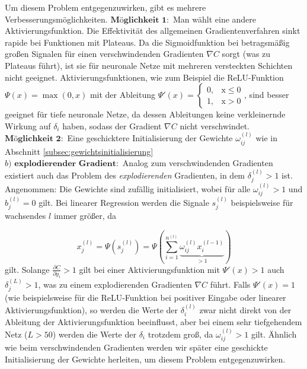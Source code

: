 Um diesem Problem entgegenzuwirken, gibt es mehrere Verbesserungsmöglichkeiten.\linebreak
$\textbf{Möglichkeit 1}:$ Man wählt eine andere Aktivierungsfunktion. Die Effektivität des allgemeinen
Gradientenverfahren sinkt rapide bei Funktionen mit Plateaus. Da die Sigmoidfunktion bei betragsmäßig großen Signalen
für einen verschwindenden Gradienten $\nabla C$ sorgt (was zu Plateaus führt), ist sie für neuronale Netze mit mehreren
versteckten Schichten nicht geeignet. Aktivierungsfunktionen, wie zum Beispiel die ReLU-Funktion $\Psi(x)=\max(0,x)$ mit
der Ableitung $\Psi'(x)= \begin {cases} 0, &\text{x}\leq 0\\ 1, &\text{x}>0\end{cases}$, sind besser geeignet für tiefe neuronale
Netze, da dessen Ableitungen keine verkleinernde Wirkung auf $\delta_i$ haben, sodass der Gradient $\nabla C$ nicht
verschwindet.\\
$\textbf{Möglichkeit 2}:$ Eine geschicktere Initialisierung der Gewichte $\omega_{ij}^{(l)}$ wie in Abschnitt
\ref{subsec:gewichtsinitialisierung}\\
$b)$ $\textbf{explodierender Gradient}:$
Analog zum verschwindenden Gradienten existiert auch das Problem des \textit{explodierenden} Gradienten, in dem
$\delta_j^{(l)}>1$ ist.\\
Angenommen: Die Gewichte sind zufällig initialisiert, wobei für alle $\omega_{ij}^{(l)}>1$ und $b_j^{(l)}=0$
gilt. Bei linearer Regression werden die Signale $s_j^{(l)}$  beispielsweise für wachsendes $l$ immer größer, da

\[
    x_j^{(l)}=\Psi(s_j^{(l)})=\Psi\left( \sum\limits_{i=1}^{n^{(l)}} \underbrace{\omega_{ij}^{(l)}x_{i}^{(l-1)}}_{>1} \right)
\]
gilt. Solange $\frac{\partial C}{\partial y_i} > 1$ gilt bei einer Aktivierungsfunktion mit $\Psi'(x)>1$ auch $\delta_j^{(L)}>1$,
was zu einem explodierenden Gradienten $\nabla C$ führt. Falls $\Psi'(x)=1$ (wie beispielsweise für die ReLU-Funktion bei
positiver Eingabe oder linearer Aktivierungsfunktion), so werden die Werte der $\delta_i^{(l)}$ zwar nicht direkt von der Ableitung
der Aktivierungsfunktion beeinflusst, aber bei einem sehr tiefgehendem Netz ($L>50$) werden die Werte der $\delta_i$ trotzdem
groß, da $\omega_{ij}^{(l)}>1$ gilt. Ähnlich wie beim verschwindenden Gradienten werden wir später eine geschickte
Initialisierung der Gewichte herleiten, um diesem Problem entgegenzuwirken.

